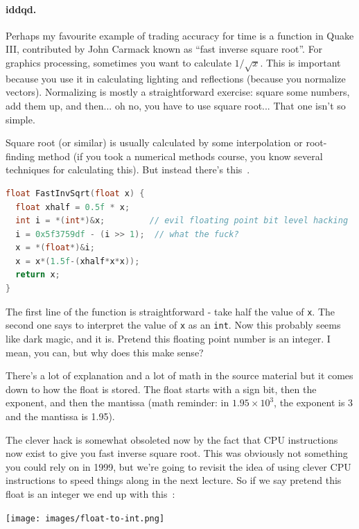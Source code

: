 \documentclass[a4paper]{report}
\begin{document}
\paragraph{iddqd.} Perhaps my favourite example of trading accuracy for time is a function in Quake III, contributed by John Carmack known as ``fast inverse square root''. For graphics processing, sometimes you want to calculate $1/\sqrt{x}$. This is important because you use it in calculating lighting and reflections (because you normalize vectors). Normalizing is mostly a straightforward exercise: square some numbers, add them up, and then... oh no, you have to use square root... That one isn't so simple.

Square root (or similar) is usually calculated by some interpolation or root-finding method (if you took a numerical methods course, you know several techniques for calculating this). But instead there's this~\cite{fisqrt}. 

\begin{lstlisting}[language=C]
float FastInvSqrt(float x) {
  float xhalf = 0.5f * x;
  int i = *(int*)&x;         // evil floating point bit level hacking
  i = 0x5f3759df - (i >> 1);  // what the fuck?
  x = *(float*)&i;
  x = x*(1.5f-(xhalf*x*x));
  return x;
}
\end{lstlisting}

The first line of the function is straightforward - take half the value of \texttt{x}. The second one says to interpret the value of \texttt{x} as an \texttt{int}. Now this probably seems like dark magic, and it is. Pretend this floating point number is an integer. I mean, you can, but why does this make sense? 

There's a lot of explanation and a lot of math in the source material but it comes down to how the float is stored. The float starts with a sign bit, then the exponent, and then the mantissa (math reminder: in $1.95 \times 10^{3}$, the exponent is 3 and the mantissa is 1.95).

The clever hack is somewhat obsoleted now by the fact that CPU instructions now exist to give you fast inverse square root. This was obviously not something you could rely on in 1999, but we're going to revisit the idea of using clever CPU instructions to speed things along in the next lecture. So if we say pretend this float is an integer we end up with this~\cite{fisqrt2}:

\begin{center}
	\texttt{[image: images/float-to-int.png]}
\end{center}
\end{document}
